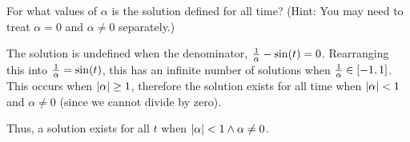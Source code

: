 For what values of $\alpha$ is the solution defined for all time?
(Hint: You may need to treat $\alpha =0$ and $\alpha \neq 0$ separately.)

\soln* The solution is undefined when the denominator, $\over{\alpha} - \sin(t) = 0$. Rearranging this into $\over{\alpha} = \sin(t)$, this has an infinite number of solutions when $\over{\alpha} \in [-1, 1]$. This occurs when $\abs{\alpha} \geq 1$, therefore the solution exists for all time when $\abs{\alpha} < 1$ and $\alpha \neq 0$ (since we cannot divide by zero).

\nl Thus, a solution exists for all $t$ when $\abs{\alpha} < 1 \land \alpha \neq 0$. 